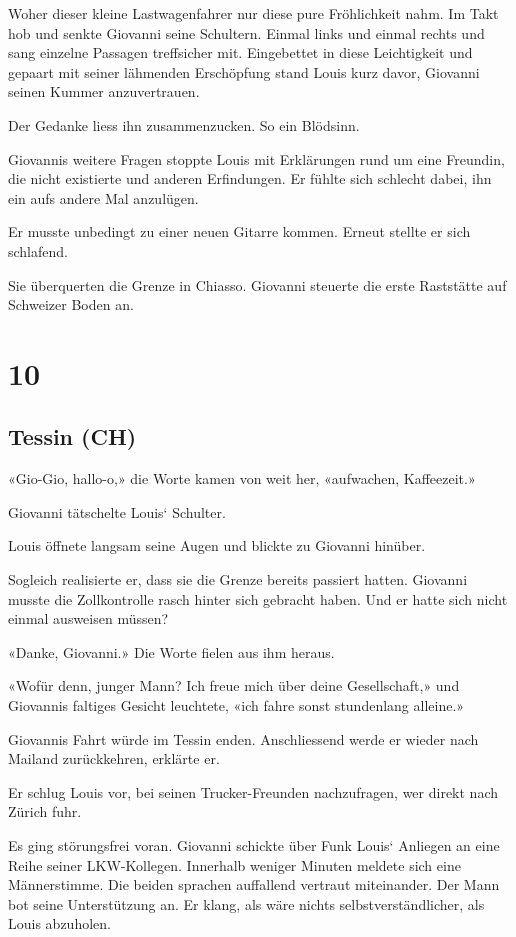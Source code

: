Woher dieser kleine Lastwagenfahrer nur diese pure Fröhlichkeit nahm. Im
Takt hob und senkte Giovanni seine Schultern. Einmal links und einmal
rechts und sang einzelne Passagen treffsicher mit. Eingebettet in diese
Leichtigkeit und gepaart mit seiner lähmenden Erschöpfung stand Louis
kurz davor, Giovanni seinen Kummer anzuvertrauen.

Der Gedanke liess ihn zusammenzucken. So ein Blödsinn.

Giovannis weitere Fragen stoppte Louis mit Erklärungen rund um eine
Freundin, die nicht existierte und anderen Erfindungen. Er fühlte sich
schlecht dabei, ihn ein aufs andere Mal anzulügen.

Er musste unbedingt zu einer neuen Gitarre kommen. Erneut stellte er
sich schlafend.

Sie überquerten die Grenze in Chiasso. Giovanni steuerte die erste
Raststätte auf Schweizer Boden an.

\chapter{10}\label{section-9}

\section{Tessin (CH)}\label{tessin-ch}

«Gio-Gio, hallo-o,» die Worte kamen von weit her, «aufwachen,
Kaffeezeit.»

Giovanni tätschelte Louis` Schulter.

Louis öffnete langsam seine Augen und blickte zu Giovanni hinüber.

Sogleich realisierte er, dass sie die Grenze bereits passiert hatten.
Giovanni musste die Zollkontrolle rasch hinter sich gebracht haben. Und
er hatte sich nicht einmal ausweisen müssen?

«Danke, Giovanni.» Die Worte fielen aus ihm heraus.

«Wofür denn, junger Mann? Ich freue mich über deine Gesellschaft,» und
Giovannis faltiges Gesicht leuchtete, «ich fahre sonst stundenlang
alleine.»

Giovannis Fahrt würde im Tessin enden. Anschliessend werde er wieder
nach Mailand zurückkehren, erklärte er.

Er schlug Louis vor, bei seinen Trucker-Freunden nachzufragen, wer
direkt nach Zürich fuhr.

Es ging störungsfrei voran. Giovanni schickte über Funk Louis` Anliegen
an eine Reihe seiner LKW-Kollegen. Innerhalb weniger Minuten meldete
sich eine Männerstimme. Die beiden sprachen auffallend vertraut
miteinander. Der Mann bot seine Unterstützung an. Er klang, als wäre
nichts selbstverständlicher, als Louis abzuholen.

